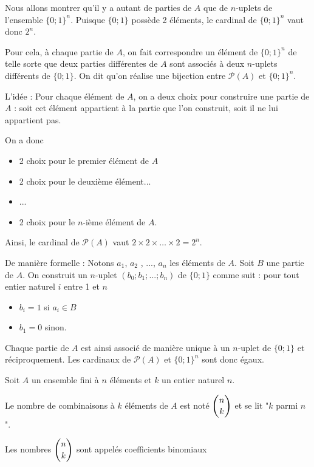\documentclass[11pt,fleqn, openany]{book} %
\begin{document}
\begin{demonstration} Nous allons montrer qu'il y a autant de parties de $A$ que de $n$-uplets de l'ensemble $\{0;1\}^n$. Puisque $\{0;1\}$ possède 2 éléments, le cardinal de $\{0;1\}^n$ vaut donc $2^n$.
 
 Pour cela, à chaque partie de $A$, on fait correspondre un élément de $\{0;1\}^n$ de telle sorte que deux parties différentes de $A$  sont associés à deux $n$-uplets différents de $\{0;1\}$. On dit qu'on réalise une bijection entre $\mathcal{P}(A)$ et $\{0;1\}^n$.
 
 L'idée : Pour chaque élément de $A$, on a deux choix pour construire une partie de $A$ : soit cet élément appartient à la partie que l'on construit, soit il ne lui appartient pas. 

\newpage 
 
 On a donc
 \begin{itemize}
 \item 2 choix pour le premier élément de $A$
 \item 2 choix pour le deuxième élément...
 \item ...
 \item 2 choix pour le $n$-ième élément de $A$.
 \end{itemize}
 Ainsi, le cardinal de $\mathcal{P}(A)$ vaut $2\times 2 \times \ldots \times 2 = 2^n$.
 
 
De manière formelle : Notons $a_1$, $a_2$ , ..., $a_n$ les éléments de $A$. 
  Soit $B$ une partie de $A$. On construit un $n$-uplet $(b_0;b_1;...;b_n)$ de $\{0;1\}$ comme suit : pour tout entier naturel $i$ entre 1 et $n$
  \begin{itemize}
  \item $b_i=1$ si $a_i \in B$
  \item $b_1=0$ sinon.
  \end{itemize}
Chaque partie de $A$ est ainsi associé de manière unique à un $n$-uplet de $\{0;1\}$ et réciproquement. Les cardinaux de $\mathcal{P}(A)$ et $\{0;1\}^n$ sont donc égaux.\end{demonstration}



\begin{definition} Soit $A$ un ensemble fini à $n$ éléments et $k$ un entier naturel $n$. 

Le nombre de combinaisons à $k$ éléments de $A$ est noté $\dbinom{n}{k}$ et se lit "$k$ parmi $n$". 

Les nombres $\dbinom{n}{k}$ sont appelés coefficients binomiaux\end{definition}
\end{document}
